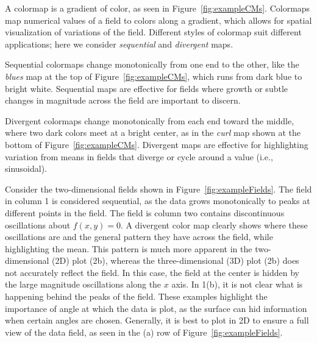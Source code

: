 A colormap is a gradient of color, as seen in Figure~\ref{fig:exampleCMs}. Colormaps map numerical values of a field to colors along a gradient, which allows for spatial visualization of variations of the field. Different styles of colormap suit different applications; here we consider \textit{sequential} and \textit{divergent} maps.


Sequential colormaps change monotonically from one end to the other, like the \textit{blues} map at the top of Figure~\ref{fig:exampleCMs}, which runs from dark blue to bright white. Sequential maps are effective for fields where growth or subtle changes in magnitude across the field are important to discern.

Divergent colormaps change monotonically from each end toward the middle, where two dark colors meet at a bright center, as in the \textit{curl} \parencite{cmoceanRep} map shown at the bottom of Figure~\ref{fig:exampleCMs}. Divergent maps are effective for highlighting variation from means in fields that diverge or cycle around a value (i.e., sinusoidal).


Consider the two-dimensional fields shown in Figure~\ref{fig:exampleFields}. The field in column 1 is considered sequential, as the data grows monotonically to peaks at different points in the field. The field is column two contains discontinuous oscillations about $f(x,y) = 0$. A divergent color map clearly shows where these oscillations are and the general pattern they have across the field, while highlighting the mean. This pattern is much more apparent in the two-dimensional (2D) plot (2b), whereas the three-dimensional (3D) plot (2b) does not accurately reflect the field. In this case, the field at the center is hidden by the large magnitude oscillations along the $x$ axis. In 1(b), it is not clear what is happening behind the peaks of the field. These examples highlight the importance of angle at which the data is plot, as the surface can hid information when certain angles are chosen. Generally, it is best to plot in 2D to ensure a full view of the data field, as seen in the (a) row of Figure~\ref{fig:exampleFields}.


